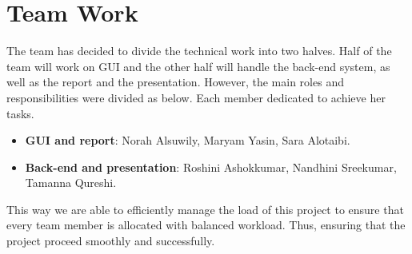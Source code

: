\documentclass{article}
\begin{document}
\section{Team Work}
The team has decided to divide the technical work into two halves. Half of the team will work on GUI and the other half will handle the back-end system, as well as the report and the presentation. However,  the main roles and responsibilities were divided as below. Each member dedicated to achieve her tasks.
\begin{itemize}

\item \textbf{GUI and report}: Norah Alsuwily, Maryam Yasin, Sara Alotaibi. 
\item \textbf{Back-end and presentation}: Roshini Ashokkumar, Nandhini Sreekumar, Tamanna Qureshi. 
\end{itemize}
This way we are able to efficiently manage the load of this project to ensure that every team member is allocated with balanced workload. Thus, ensuring that the project proceed smoothly and successfully.
\end{document}
